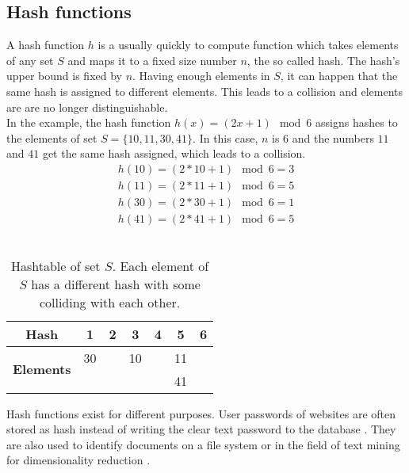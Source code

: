\subsection{Hash functions}
A hash function $ h $ is a usually quickly to compute function which takes  elements of any set $ S $ and maps it to a fixed size number $ n $, the so called hash. The hash's upper bound is fixed by $ n $. Having enough elements in $ S $, it can happen that the same hash is assigned to different elements. This leads to a collision and elements are are no longer distinguishable.\\

In the example, the hash function $ h(x) = (2x+1) \mod 6 $ assigns hashes to the elements of set $ S = \{ 10,11,30,41 \} $.  In this case, $ n $ is $ 6 $ and the numbers $ 11 $ and $ 41 $ get the same hash assigned, which leads to a collision.\\

\begin{equation}
    \begin{split}
        h(10) = (2 * 10 + 1) \mod 6 = 3  \\
        h(11) = (2 * 11 + 1) \mod 6 = 5 \\
        h(30) = (2 * 30 + 1) \mod 6 = 1 \\
        h(41) = (2 * 41 + 1) \mod 6 = 5
    \end{split}
\end{equation}\\

\begin{table}[H]
    \centering
    \begin{tabular}{| c | c | c | c | c | c | c |}
        \hline
        \textbf{Hash} & \textbf{1} & \textbf{2} & \textbf{3} & \textbf{4} & \textbf{5} & \textbf{6}  \\
        \hline
        \multirow{2}{*}{\textbf{Elements}}   & 30 &    & 10 &    & 11 & \\
        &    &    &    &    & 41  &\\
        \hline
    \end{tabular}    
    \caption{Hashtable of set $ S $. Each element of $ S $ has a different  hash with some colliding with each other.}
\end{table}

Hash functions exist for different purposes. User passwords of websites are often stored as hash instead of writing the clear text password to the database \cite{cryptographicHashFunctions}. They are also used to identify documents on a file system or in the field of text mining for dimensionality reduction \cite{practicalHashFunctions}.\\

